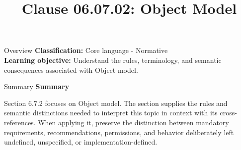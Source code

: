 \documentclass[10pt,letterpaper]{article}
\title{Clause 06.07.02: Object Model}
\author{}
\date{}
\begin{document}
\maketitle
\begin{CornellOverviewBox}{Overview}
\textbf{Classification:} Core language - Normative\\[2pt]
\textbf{Learning objective:} Understand the rules, terminology, and semantic consequences associated with Object model.
\end{CornellOverviewBox}\begin{CornellSummaryBox}{Summary}
{\sffamily\bfseries\color{Accent} Summary}\par\vspace{3pt}Section 6.7.2 focuses on Object model. The section supplies the rules and semantic distinctions needed to interpret this topic in context with its cross-references. When applying it, preserve the distinction between mandatory requirements, recommendations, permissions, and behavior deliberately left undefined, unspecified, or implementation-defined.
\end{CornellSummaryBox}
\end{document}
